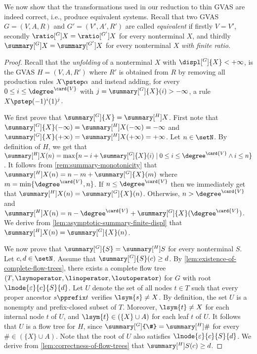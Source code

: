 We now show that the transformations
used in our reduction to thin GVAS are indeed correct,
i.e., produce equivalent systems.
Recall that
two GVAS $G = (V, A, R)$ and $G' = (V', A', R')$ are called
\emph{equivalent} if
firstly $V = V'$,
secondly $\ratio[^{G}]{X}=\ratio[^{G'}]{X}$ for every nonterminal $X$, and
thirdly $\summary[^{G}]{X}=\summary[^{G'}]{X}$ for every nonterminal $X$ \emph{with finite ratio}.

\factsummarization*
\begin{proof}
Recall that
the \emph{unfolding}
of a nonterminal $X$ with $\displ[^G]{X}<+\infty$,
is the GVAS $H = (V, A, R')$ where
$R'$ is obtained from $R$ by
removing all production rules $X \pstep \alpha$ and
instead adding, for every $0\le i\le\degree^{\card{V}}$
with $j=\summary[^G]{X}(i) > -\infty$,
a rule $X \pstep (-1)^i (1)^j$.

\smallskip

  We first prove that $\summary[^G]{X} = \summary[^{H}]{X}$.
  First note that
  $\summary[^G]{X}(-\infty) = \summary[^{H}]{X}(-\infty) = -\infty$
  and
  $\summary[^G]{X}(+\infty) = \summary[^{H}]{X}(+\infty) = +\infty$.
  Let $n \in \setN$.
  By definition of $H$,
  we get that
  $\summary[^{H}]{X}(n) = \max
  \{n - i + \summary[^G]{X}(i) \mid 0 \leq i \leq \degree^{\card{V}} \wedge i \leq n\}$.
  It follows from \cref{rem:summary-monotonicity} that
  $\summary[^{H}]{X}(n) = n - m + \summary[^G]{X}(m)$ where
  $m = \min \{\degree^{\card{V}}, n\}$.
  If $n \leq \degree^{\card{V}}$ then we immediately get that
  $\summary[^{H}]{X}(n) = \summary[^G]{X}(n)$.
  Otherwise, $n > \degree^{\card{V}}$ and
  $\summary[^{H}]{X}(n) = n - \degree^{\card{V}} + \summary[^G]{X}(\degree^{\card{V}})$.
  We derive from \cref{lem:asymptotic-summary-finite-displ}
  that $\summary[^{H}]{X}(n) = \summary[^G]{X}(n)$.

  \smallskip

  We now prove that $\summary[^G]{S} = \summary[^{H}]{S}$
  for every nonterminal $S$.
  Let $c, d \in \setN$.
  Assume that $\summary[^G]{S}(c) \geq d$.
  By \cref{lem:existence-of-complete-flow-trees},
  there exists a complete flow tree
  $(T, \lsymoperator, \linoperator, \loutoperator)$ for $G$
  with root $\lnode{\varepsilon}{c}{S}{d}$.
  Let $U$ denote the set of all nodes $t \in T$ such that every
  proper ancestor $s \pprefix t$ verifies $\lsym{s} \neq X$.
  By definition,
  the set $U$ is a nonempty and prefix-closed subset of $T$.
  Moreover,
  $\lsym{t} \neq X$ for each internal node $t$ of $U$,
  and $\lsym{t} \in (\{X\} \cup A)$ for each leaf $t$ of $U$.
  It follows that $U$ is a flow tree for $H$,
  since $\summary[^G]{\#} = \summary[^{H}]{\#}$ for every $\# \in (\{X\} \cup A)$.
  Note that the root of $U$ also satisfies $\lnode{\varepsilon}{c}{S}{d}$.
  We derive from \cref{lem:correctness-of-flow-trees} that
  $\summary[^{H}]{S}(c) \geq d$.


\end{proof}
